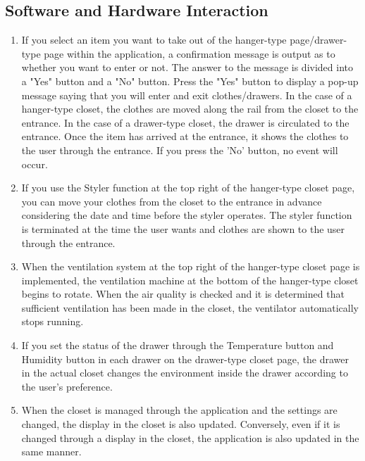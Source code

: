 \documentclass[conference]{IEEEtran}
\begin{document}
\subsection{Software and Hardware Interaction}
\begin{enumerate}
    \item If you select an item you want to take out of the hanger-type page/drawer-type page within the application, a confirmation message is output as to whether you want to enter or not. The answer to the message is divided into a "Yes" button and a "No" button. Press the "Yes" button to display a pop-up message saying that you will enter and exit clothes/drawers. In the case of a hanger-type closet, the clothes are moved along the rail from the closet to the entrance. In the case of a drawer-type closet, the drawer is circulated to the entrance. Once the item has arrived at the entrance, it shows the clothes to the user through the entrance. If you press the 'No' button, no event will occur.
    \item If you use the Styler function at the top right of the hanger-type closet page, you can move your clothes from the closet to the entrance in advance considering the date and time before the styler operates. The styler function is terminated at the time the user wants and clothes are shown to the user through the entrance.
    \item When the ventilation system at the top right of the hanger-type closet page is implemented, the ventilation machine at the bottom of the hanger-type closet begins to rotate. When the air quality is checked and it is determined that sufficient ventilation has been made in the closet, the ventilator automatically stops running.
    \item If you set the status of the drawer through the Temperature button and Humidity button in each drawer on the drawer-type closet page, the drawer in the actual closet changes the environment inside the drawer according to the user's preference.
    \item When the closet is managed through the application and the settings are changed, the display in the closet is also updated. Conversely, even if it is changed through a display in the closet, the application is also updated in the same manner.
\end{enumerate}
\end{document}

